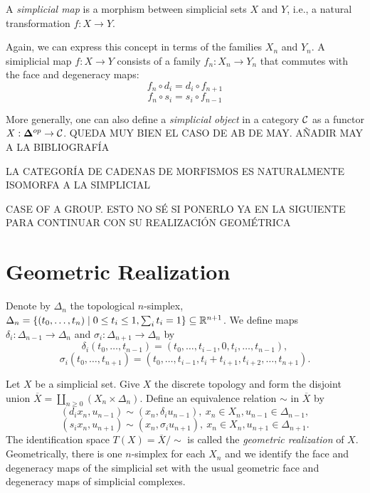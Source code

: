 \documentclass[TFM.tex]{subfiles}
\begin{document}
\begin{defi}
A \emph{simplicial map} is a morphism between simplicial sets $X$ and $Y$, i.e., a natural transformation $f: X\to Y$.
\end{defi}

Again, we can express this concept in terms of the families $X_n$ and $Y_n$. A simiplicial map $f:X\to Y$ consists of a family $f_n:X_n\to Y_n$ that commutes with the face and degeneracy maps:
\[f_n\circ d_i=d_i\circ f_{n+1}\]
\[f_n\circ s_i=s_i\circ f_{n-1}\]

More generally, one can also define a \emph{simplicial object} in a category $\mathcal{C}$ as a functor $X:\mathbf{\Delta}^{op}\to\mathcal{C}$. 
QUEDA MUY BIEN EL CASO DE AB DE MAY. AÑADIR MAY A LA BIBLIOGRAFÍA
\begin{ex}

LA CATEGORÍA DE CADENAS DE MORFISMOS ES NATURALMENTE ISOMORFA A LA SIMPLICIAL
\end{ex}

\begin{ex}
CASE OF A GROUP. ESTO NO SÉ SI PONERLO YA EN LA SIGUIENTE PARA CONTINUAR CON SU REALIZACIÓN GEOMÉTRICA
\end{ex}


\section{Geometric Realization}

Denote by $\Delta_n$ the topological $n$-simplex, $\Delta_n=\{(t_0,\dots, t_n)\mid 0\leq t_i\leq 1, \sum_i t_i=1\}\subseteq\mathbb{R}^{n+1}$. We define maps $\delta_i:\Delta_{n-1}\to\Delta_n$ and $\sigma_i:\Delta_{n+1}\to\Delta_n$ by
\[
\delta_i(t_0,\dots, t_{n-1})=(t_0,\dots, t_{i-1},0,t_i,\dots, t_{n-1}),
\]
\[\sigma_i(t_0,\dots, t_{n+1})=(t_0,\dots, t_{i-1},t_i+t_{i+1},t_{i+2},\dots, t_{n+1}).\]

Let $X$ be a simplicial set. Give $X$ the discrete topology and form the disjoint union $\overline{X}=\coprod_{n\geq 0}(X_n\times\Delta_n)$. Define an equivalence relation $\sim$ in $\overline{X}$ by
\[(d_ix_n,u_{n-1})\sim(x_n,\delta_i u_{n-1}),\ x_n\in X_n, u_{n-1}\in\Delta_{n-1},\]
\[(s_ix_n,u_{n+1})\sim(x_n,\sigma_iu_{n+1}),\ x_n\in X_n, u_{n+1}\in\Delta_{n+1}.\]
The identification space $T(X)=\overline{X}/\sim$ is called the \emph{geometric realization} of $X$. Geometrically, there is one $n$-simplex for each $X_n$ and we identify the face and degeneracy maps of the simplicial set with the usual geometric face and degeneracy maps of simplicial complexes. 
\end{document}
